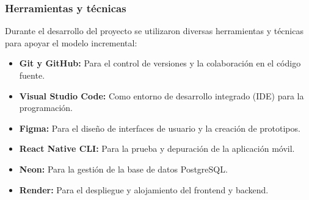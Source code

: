 \subsubsection{Herramientas y técnicas}

Durante el desarrollo del proyecto se utilizaron diversas herramientas y técnicas para apoyar el modelo incremental:

\begin{itemize}
    \item \textbf{Git y GitHub:} Para el control de versiones y la colaboración en el código fuente.
    \item \textbf{Visual Studio Code:} Como entorno de desarrollo integrado (IDE) para la programación.
    \item \textbf{Figma:} Para el diseño de interfaces de usuario y la creación de prototipos.
    \item \textbf{React Native CLI:} Para la prueba y depuración de la aplicación móvil.
    \item \textbf{Neon:} Para la gestión de la base de datos PostgreSQL.
    \item \textbf{Render:} Para el despliegue y alojamiento del frontend y backend.
\end{itemize}
